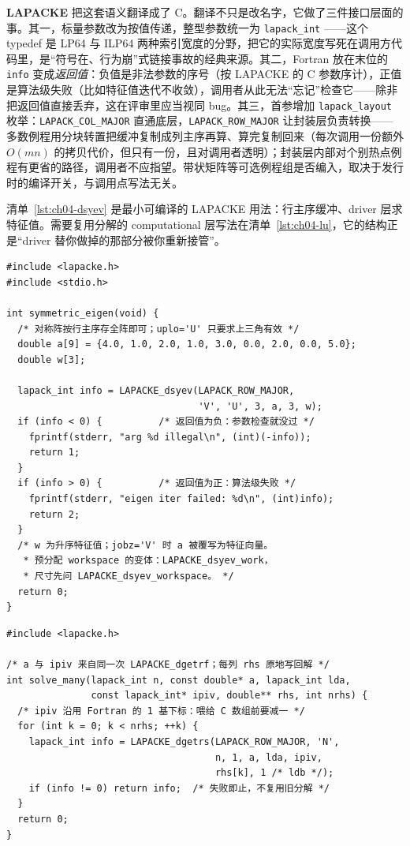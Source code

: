 \documentclass[12pt,a4paper,fontset=fandol]{ctexbook}
\newcommand{\Tp}[1]{\texttt{#1}}
\newcommand{\Bk}{\allowbreak}
\newcommand{\Lib}[1]{\textbf{#1}}
\begin{document}
\Lib{LAPACKE} 把这套语义翻译成了 C。翻译不只是改名字，它做了三件接口层面的事。其一，标量参数改为按值传递，整型参数统一为 \Tp{lapack\_int} \Bk{}——这个 typedef 是 LP64 与 ILP64 两种索引宽度的分野，把它的实际宽度写死在调用方代码里，是``符号在、行为崩''式链接事故的经典来源。其二，Fortran 放在末位的 \Tp{info} 变成\emph{返回值}：负值是非法参数的序号（按 LAPACKE 的 C 参数序计），正值是算法级失败（比如特征值迭代不收敛），调用者从此无法``忘记''检查它——除非把返回值直接丢弃，这在评审里应当视同 bug。其三，首参增加 \Tp{lapack\_layout} \Bk{} 枚举：\Tp{LAPACK\_COL\_MAJOR} 直通底层，\Tp{LAPACK\_ROW\_MAJOR} 让封装层负责转换——多数例程用分块转置把缓冲复制成列主序再算、算完复制回来（每次调用一份额外 $O(mn)$ 的拷贝代价，但只有一份，且对调用者透明）；封装层内部对个别热点例程有更省的路径，调用者不应指望。带状矩阵等可选例程组是否编入，取决于发行时的编译开关，与调用点写法无关。

清单~\ref{lst:ch04-dsyev} 是最小可编译的 LAPACKE 用法：行主序缓冲、driver 层求特征值。需要复用分解的 computational 层写法在清单~\ref{lst:ch04-lu}，它的结构正是``driver 替你做掉的那部分被你重新接管''。

\begin{lstlisting}[style=cstyle,caption={LAPACKE 的 \Tp{dsyev}：行主序、info 为返回值、输出覆写输入},label={lst:ch04-dsyev}]
#include <lapacke.h>
#include <stdio.h>

int symmetric_eigen(void) {
  /* 对称阵按行主序存全阵即可；uplo='U' 只要求上三角有效 */
  double a[9] = {4.0, 1.0, 2.0, 1.0, 3.0, 0.0, 2.0, 0.0, 5.0};
  double w[3];

  lapack_int info = LAPACKE_dsyev(LAPACK_ROW_MAJOR,
                                  'V', 'U', 3, a, 3, w);
  if (info < 0) {          /* 返回值为负：参数检查就没过 */
    fprintf(stderr, "arg %d illegal\n", (int)(-info));
    return 1;
  }
  if (info > 0) {          /* 返回值为正：算法级失败 */
    fprintf(stderr, "eigen iter failed: %d\n", (int)info);
    return 2;
  }
  /* w 为升序特征值；jobz='V' 时 a 被覆写为特征向量。
   * 预分配 workspace 的变体：LAPACKE_dsyev_work，
   * 尺寸先问 LAPACKE_dsyev_workspace。 */
  return 0;
}
\end{lstlisting}

\begin{lstlisting}[style=cstyle,caption={computational 层：一次 \Tp{dgetrf} 分解、多次 \Tp{dgetrs} 回代},label={lst:ch04-lu}]
#include <lapacke.h>

/* a 与 ipiv 来自同一次 LAPACKE_dgetrf；每列 rhs 原地写回解 */
int solve_many(lapack_int n, const double* a, lapack_int lda,
               const lapack_int* ipiv, double** rhs, int nrhs) {
  /* ipiv 沿用 Fortran 的 1 基下标：喂给 C 数组前要减一 */
  for (int k = 0; k < nrhs; ++k) {
    lapack_int info = LAPACKE_dgetrs(LAPACK_ROW_MAJOR, 'N',
                                     n, 1, a, lda, ipiv,
                                     rhs[k], 1 /* ldb */);
    if (info != 0) return info;  /* 失败即止，不复用旧分解 */
  }
  return 0;
}
\end{lstlisting}
\end{document}
